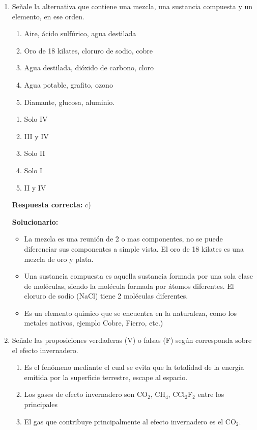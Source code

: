 \begin{enumerate}
	\item Señale la alternativa que contiene una mezcla, una sustancia compuesta y un elemento, en ese orden.
	
	\begin{enumerate}[label=\Roman*.]
		\item Aire, ácido sulfúrico, agua destilada
		\item Oro de 18 kilates, cloruro de sodio, cobre
		\item Agua destilada, dióxido de carbono, cloro
		\item Agua potable, grafito, ozono
		\item Diamante, glucosa, aluminio.
	\end{enumerate}
	
	\begin{enumerate}[label=\alph*)]
		\item Solo IV
		\item III y IV
		\item Solo II
		\item Solo I
		\item II y IV
	\end{enumerate}
	
	\textbf{Respuesta correcta:} c)
	
	\vspace{2mm}
	\textbf{Solucionario:}\\
	
	\begin{itemize}
		\item La mezcla es una reunión de 2 o mas componentes, no se puede diferenciar sus componentes a simple vista. El oro de 18 kilates es una mezcla de oro y plata.
		\item Una sustancia compuesta es aquella sustancia formada por una sola clase de moléculas, siendo la molécula formada por átomos diferentes. El cloruro de sodio (NaCl) tiene 2 moléculas diferentes.
		\item Es un elemento quimico que se encuentra en la naturaleza, como los metales nativos, ejemplo Cobre, Fierro, etc.)
	\end{itemize}
	
	\vspace{6mm}
	
	\item Señale las proposiciones verdaderas (V) o falsas (F) según corresponda sobre el efecto invernadero.
	
	\begin{enumerate}[label=\Roman*.]
		\item Es el fenómeno mediante el cual se evita que la totalidad de la energía emitida por la superficie terrestre, escape al espacio.
		\item Los gases de efecto invernadero son CO$_2$, CH$_4$, CCl$_2$F$_2$ entre los principales
		\item El gas que contribuye principalmente al efecto invernadero es el CO$_2$.
	\end{enumerate}
	

\end{enumerate}
